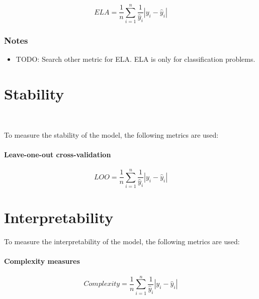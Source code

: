 \begin{equation}
    \label{eq:ela}
    ELA = \frac{1}{n} \sum_{i=1}^{n} \frac{1}{\hat{y}_i} |y_i - \hat{y}_i|
\end{equation}

\subsubsection*{Notes} 

\begin{itemize}
    \item TODO: Search other metric for ELA. ELA is only for classification problems.
\end{itemize}



\section{Stability}\

To measure the stability of the model, the following metrics are used:

\paragraph*{Leave-one-out cross-validation}

\begin{equation}
    \label{eq:loo}
    LOO = \frac{1}{n} \sum_{i=1}^{n} \frac{1}{\hat{y}_i} |y_i - \hat{y}_i|
\end{equation}


\section{Interpretability}


To measure the interpretability of the model, the following metrics are used:

\paragraph*{Complexity measures}

\begin{equation}
    \label{eq:complexity}
    Complexity = \frac{1}{n} \sum_{i=1}^{n} \frac{1}{\hat{y}_i} |y_i - \hat{y}_i|
\end{equation}

